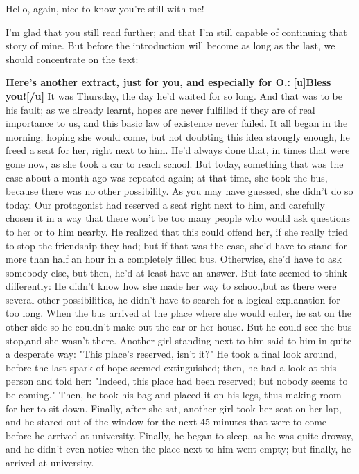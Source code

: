 Hello, again, nice to know you're still with me!

I'm glad that you still read further; and that I'm still capable of continuing that story of mine. But before the introduction will become as long as the last, we should concentrate on the text:

\textbf{Here's another extract, just for you, and especially for O.:}
\textbf{[u]Bless you![/u]}
It was Thursday, the day he'd waited for so long. 
And that was to be his fault; as we already learnt, hopes are never fulfilled if they are of real importance to us, and this basic law of existence never failed. 
It all began in the morning; hoping she would come, but not doubting this idea strongly enough, he freed a seat for her, right next to him. 
He'd always done that, in times that were gone now, as she took a car to reach school. 
But today, something that was the case about a month ago was repeated again; at that time, she took the bus, because there was no other possibility. 
As you may have guessed, she didn't do so today. 
Our protagonist had reserved a seat right next to him, and carefully chosen it in a way that there won't be too many people who would ask questions to her or to him nearby. He realized that this could offend her, if she really tried to stop the friendship they had; but if that was the case, she'd have to stand for more than half an hour in a completely filled bus. 
Otherwise, she'd have to ask somebody else, but then, he'd at least have an answer. 
But fate seemed to think differently: He didn't know how she made her way to school,but as there were several other possibilities, he didn't have to search for a logical explanation for too long. 
When the bus arrived at the place where she would enter, he sat on the other side so he couldn't make out the car or her house. 
But he could see the bus stop,and she wasn't there. 
Another girl standing next to him said to him in quite a desperate way: "This place's reserved, isn't it?" He took a final look around, before the last spark of hope seemed extinguished; then, he had a look at this person and told her: "Indeed, this place had been reserved; but nobody seems to be coming." 
Then, he took his bag and placed it on his legs, thus making room for her to sit down. Finally, after she sat, another girl took her seat on her lap, and he stared out of the window for the next 45 minutes that were to come before he arrived at university. 
Finally, he began to sleep, as he was quite drowsy, and he didn't even notice when the place next to him went empty; but finally, he arrived at university. 

